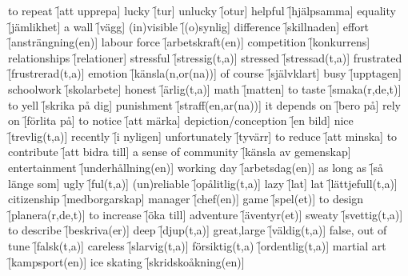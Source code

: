 \begin{questions}
    \begin{multicols}{2}
        \raggedcolumns
        \question to repeat \f[att upprepa]
        \question lucky \f[tur]
        \question unlucky \f[otur]
        \question helpful \f[hjälpsamma]
        \question equality \f[jämlikhet]
        \question a wall \f[vägg]
        \question (in)visible \f[(o)synlig]
        \question difference \f[skillnaden]
        \question effort \f[ansträngning(en)]
        \question labour force \f[arbetskraft(en)]
        \question competition \f[konkurrens]
        \question relationships \f[relationer]
        \question stressful \f[stressig(t,a)]
        \question stressed \f[stressad(t,a)]
        \question frustrated \f[frustrerad(t,a)]
        \question emotion \f[känsla(n,or(na))]
        \question of course \f[självklart]
        \question busy \f[upptagen]
        \question schoolwork \f[skolarbete]
        \question honest \f[ärlig(t,a)]
        \question math \f[matten]
        \question to taste \f[smaka(r,de,t)]
        \question to yell \f[skrika på dig]
        \question punishment \f[straff(en,ar(na))]
        \question it depends on \f[bero på]
        \question rely on \f[förlita på]
        \question to notice \f[att märka]
        \question depiction/conception \f[en bild]
        \question nice \f[trevlig(t,a)]
        \question recently \f[i nyligen]
        \question unfortunately \f[tyvärr]
        \question to reduce \f[att minska]
        \question to contribute \f[att bidra till]
        \question a sense of community \f[känsla av gemenskap]
        \question entertainment \f[underhållning(en)]
        \question working day \f[arbetsdag(en)]
        \question as long as \f[så länge som]
        \question ugly \f[ful(t,a)]
        \question (un)reliable \f[opålitlig(t,a)]
        \question lazy \f[lat]
        \question lat \f[lättjefull(t,a)]
        \question citizenship \f[medborgarskap]
        \question manager \f[chef(en)]
        \question game \f[spel(et)]
        \question to design \f[planera(r,de,t)]
        \question to increase \f[öka till]
        \question adventure \f[äventyr(et)]
        \question sweaty \f[svettig(t,a)]
        \question to describe \f[beskriva(er)]
        \question deep \f[djup(t,a)]
        \question great,large \f[väldig(t,a)]
        \question false, out of tune \f[falsk(t,a)]
        \question careless \f[slarvig(t,a)]
        \question försiktig(t,a) \f[ordentlig(t,a)]
        \question martial art \f[kampsport(en)]
        \question ice skating \f[skridskoåkning(en)]

\end{multicols}
\end{questions}
